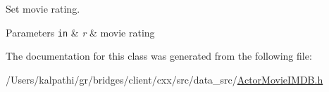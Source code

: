 Set movie rating. 


\begin{DoxyParams}[1]{Parameters}
\mbox{\tt in}  & {\em r} & movie rating \\
\hline
\end{DoxyParams}


The documentation for this class was generated from the following file\+:\begin{DoxyCompactItemize}
\item 
/\+Users/kalpathi/gr/bridges/client/cxx/src/data\+\_\+src/\mbox{\hyperlink{_actor_movie_i_m_d_b_8h}{Actor\+Movie\+I\+M\+D\+B.\+h}}\end{DoxyCompactItemize}
